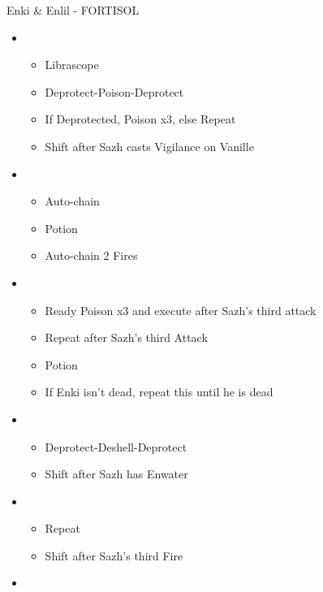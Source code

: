 \begin{battle}[1:23]{Enki \& Enlil - FORTISOL}

		\begin{itemize}
			\item \third
			      \begin{itemize}
				      \item Librascope
				      \item Deprotect-Poison-Deprotect
				      \item If Deprotected, Poison x3, else Repeat
				      \item Shift after Sazh casts Vigilance on Vanille
			      \end{itemize}
				      \item \fourth
				            \begin{itemize}
					            \item Auto-chain
					            \item Potion
                                                                 \item Auto-chain 2 Fires
				            \end{itemize}
			\item \sixth
			      \begin{itemize}
				      \item Ready Poison x3 and execute after Sazh's third attack
				      \item Repeat after Sazh's third Attack
                                                 \item Potion
                                                 \item If Enki isn't dead, repeat this until he is dead
			      \end{itemize}
			\item \third
			      \begin{itemize}
				      \item Deprotect-Deshell-Deprotect
				      \item Shift after Sazh has Enwater
			      \end{itemize}
			\item \fourth
			      \begin{itemize}
				      \item Repeat
				      \item Shift after Sazh's third Fire
			      \end{itemize}
			\item \fifth
			      \begin{itemize}

\end{itemize}
\end{itemize}
\end{battle}
